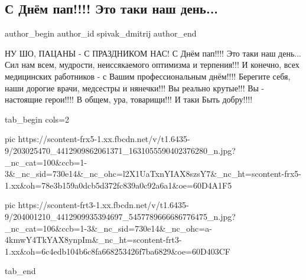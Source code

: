  
 
 
 
 
 
\subsection{С Днём пап!!!! Это таки наш день...}
\label{sec:20_06_2021.fb.spivak_dmitrij.1.den_pap_prazdnik}
\ifcmt
 author_begin
   author_id spivak_dmitrij
 author_end
\fi

НУ ШО, ПАЦАНЫ - С ПРАЗДНИКОМ НАС! 
С Днём пап!!!! Это таки наш день...
Сил нам всем, мудрости, неиссякаемого оптимизма и терпения!!! 
И конечно, всех медицинских работников - с Вашим профессиональным днём!!!! 
Берегите себя, наши дорогие врачи, медсестры и нянечки!!! 
Вы реально крутые!!! 
Вы - настоящие герои!!!! 
В общем, ура, товарищи!!! 
И таки Быть добру!!!!

\ifcmt
  tab_begin cols=2

     pic https://scontent-frx5-1.xx.fbcdn.net/v/t1.6435-9/203025470_4412909862061371_1631055590402376280_n.jpg?_nc_cat=100&ccb=1-3&_nc_sid=730e14&_nc_ohc=l2X1UaTxnYIAX8szsY7&_nc_ht=scontent-frx5-1.xx&oh=78e3b159a0dcb5d372fc839a0c92a6a1&oe=60D4A1F5

     pic https://scontent-frt3-1.xx.fbcdn.net/v/t1.6435-9/204001210_4412909935394697_5457789666686776475_n.jpg?_nc_cat=106&ccb=1-3&_nc_sid=730e14&_nc_ohc=a-4kmwY4TkYAX8ynpIm&_nc_ht=scontent-frt3-1.xx&oh=6c4edb104b6c8fa668253426f7ba6829&oe=60D403CF

  tab_end
\fi

